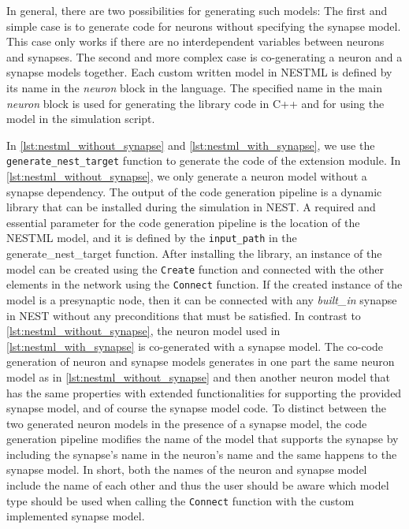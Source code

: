 In general, there are two possibilities for generating such models: The first and simple case is to generate code for neurons without specifying the synapse model. This case only works if there are no interdependent variables between neurons and synapses. The second and more complex case is co-generating a neuron and a synapse models together. Each custom written model in NESTML is defined by its name in the \emph{neuron} block in the language. The specified name in the main \emph{neuron} block is used for generating the library code in C++ and for using the model in the simulation script.


In \autoref{lst:nestml_without_synapse} and \autoref{lst:nestml_with_synapse}, we use the \texttt{generate\_nest\_target} function to generate the code of the extension module. In  \autoref{lst:nestml_without_synapse}, we only generate a neuron model without a synapse dependency. The output of the code generation pipeline is a dynamic library that can be installed during the simulation in NEST. A required and essential parameter for the code generation pipeline is the location of the NESTML model, and it is defined by the \texttt{input\_path} in the {generate\_nest\_target} function. After installing the library, an instance of the model can be created using the \texttt{Create} function and connected with the other elements in the network using the \texttt{Connect} function. If the created instance of the model is a presynaptic node, then it can be connected with any \emph{built\_in} synapse in NEST without any preconditions that must be satisfied. In contrast to \autoref{lst:nestml_without_synapse}, the neuron model used in \autoref{lst:nestml_with_synapse} is co-generated with a synapse model. The co-code generation of neuron and synapse models generates in one part the same neuron model as in  \autoref{lst:nestml_without_synapse} and then another neuron model that has the same properties with extended functionalities for supporting the provided synapse model, and of course the synapse model code. To distinct between the two generated neuron models in the presence of a synapse model, the code generation pipeline modifies the name of the model that supports the synapse by including the synapse's name in the neuron's name and the same happens to the synapse model. In short, both  the names of the neuron and synapse model include the name of each other and thus the user should be aware which model type should be used when calling the \texttt{Connect} function with the custom implemented synapse model.

